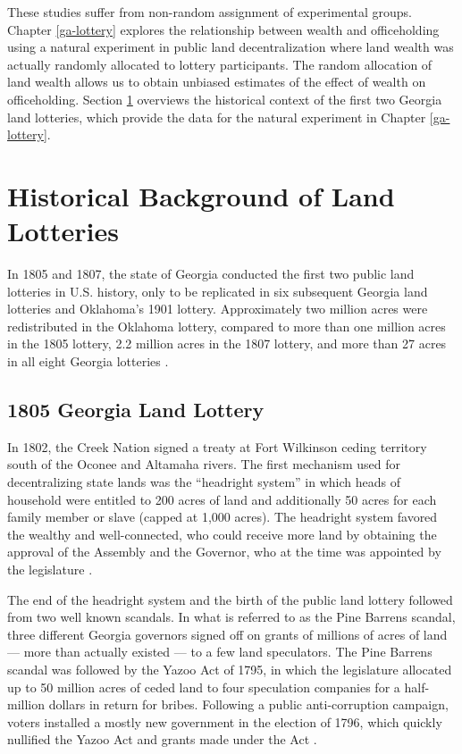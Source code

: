 These studies suffer from non-random assignment of experimental groups. Chapter \ref{ga-lottery} explores the relationship between wealth and officeholding using a natural experiment in public land decentralization where land wealth was actually randomly allocated to lottery participants. The random allocation of land wealth allows us to obtain unbiased estimates of the effect of wealth on officeholding. Section \ref{land-lotteries-background} overviews the historical context of the first two Georgia land lotteries, which provide the data for the natural experiment in Chapter \ref{ga-lottery}.%

\section{Historical Background of Land Lotteries} \label{land-lotteries-background}

In 1805 and 1807, the state of Georgia conducted the first two public land lotteries in U.S. history, only to be replicated in six subsequent Georgia land lotteries and Oklahoma's 1901 lottery. Approximately two million acres were redistributed in the Oklahoma lottery, compared to more than one million acres in the 1805 lottery, 2.2 million acres in the 1807 lottery, and more than 27 acres in all eight Georgia lotteries \citep{graham2004}. 

\subsection{1805 Georgia Land Lottery}

In 1802, the Creek Nation signed a treaty at Fort Wilkinson ceding territory south of the Oconee and Altamaha rivers. The first mechanism used for decentralizing state lands was the ``headright system'' in which heads of household were entitled to 200 acres of land and additionally 50 acres for each family member or slave (capped at 1,000 acres). The headright system favored the wealthy and well-connected, who could receive more land by obtaining the approval of the Assembly and the Governor, who at the time was appointed by the legislature \citep{meyers2012}. 

The end of the headright system and the birth of the public land lottery followed from two well known scandals. In what is referred to as the Pine Barrens scandal, three different Georgia governors signed off on grants of millions of acres of land --- more than actually existed --- to a few land speculators. The Pine Barrens scandal was followed by the Yazoo Act of 1795, in which the legislature allocated up to 50 million acres of ceded land to four speculation companies for a half-million dollars in return for bribes. Following a public anti-corruption campaign, voters installed a mostly new government in the election of 1796, which quickly nullified the Yazoo Act and grants made under the Act \citep{meyers2012}. 

